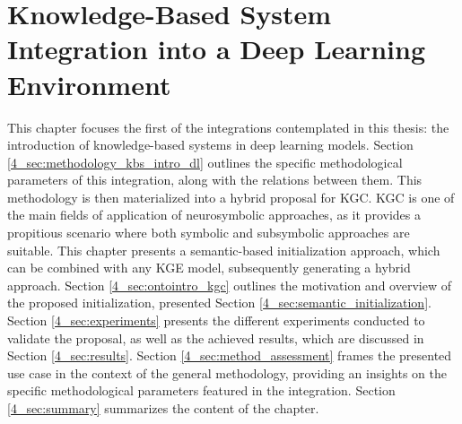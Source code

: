 \chapter{Knowledge-Based System Integration into a Deep Learning Environment}\label{chap:kbsintegrationdl}

This chapter focuses the first of the integrations contemplated in this thesis: the introduction of knowledge-based systems in deep learning models. Section \ref{4_sec:methodology_kbs_intro_dl} outlines the specific methodological parameters of this integration, along with the relations between them. This methodology is then materialized into a hybrid proposal for KGC. KGC is one of the main fields of application of neurosymbolic approaches, as it provides a propitious scenario where both symbolic and subsymbolic approaches are suitable. This chapter presents a semantic-based initialization approach, which can be combined with any KGE model, subsequently generating a hybrid approach. Section \ref{4_sec:ontointro_kgc} outlines the motivation and overview of the proposed initialization, presented Section \ref{4_sec:semantic_initialization}. Section \ref{4_sec:experiments} presents the different experiments conducted to validate the proposal, as well as the achieved results, which are discussed in Section \ref{4_sec:results}. Section \ref{4_sec:method_assessment} frames the presented use case in the context of the general methodology, providing an insights on the specific methodological parameters featured in the integration. Section \ref{4_sec:summary} summarizes the content of the chapter. 

